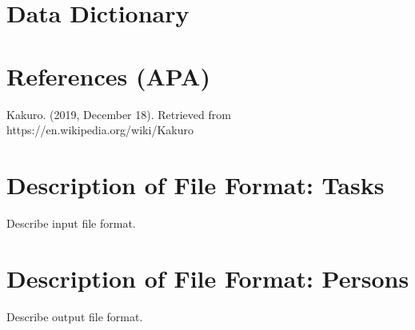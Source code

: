 \documentclass[12pt]{article}
\begin{document}
\clearpage

\section{Data Dictionary}

\clearpage

\section{References (APA)}

Kakuro. (2019, December 18). Retrieved from https://en.wikipedia.org/wiki/Kakuro
\clearpage
\appendix

\section{Description of File Format: Tasks}

Describe input file format.

\section{Description of File Format: Persons}

Describe output file format.
\end{document}

